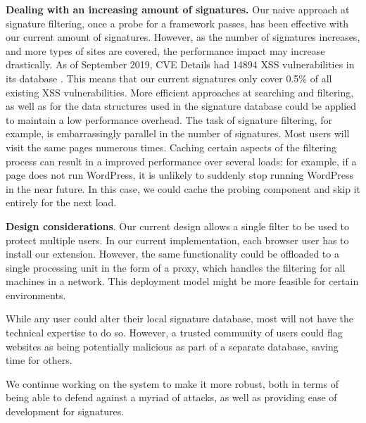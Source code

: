\textbf{Dealing with an increasing amount of signatures.} Our naive approach at signature filtering, once a probe for a framework passes, has been effective with our current amount of signatures. However, as the number of signatures increases, and more types of sites are covered, the performance impact may increase drastically. As of September 2019, CVE Details had 14894 \ac{XSS} vulnerabilities in its database \cite{vulnbytype}. This means that our current signatures only cover 0.5\% of all existing \ac{XSS} vulnerabilities. More efficient approaches at searching and filtering, as well as for the data structures used in the signature database could be applied to maintain a low performance overhead. The task of signature filtering, for example, is embarrassingly parallel in the number of signatures. Most users will visit the same pages numerous times. Caching certain aspects of the filtering process can result in a improved performance over several loads: for example, if a page does not run WordPress, it is unlikely to suddenly stop running WordPress in the near future. In this case, we could cache the probing component and skip it entirely for the next load.

\textbf{Design considerations}. Our current design allows a single filter to be used to protect multiple users. In our current implementation, each browser user has to install our extension. However, the same functionality could be offloaded to a single processing unit in the form of a proxy, which handles the filtering for all machines in a network. This deployment model might be more feasible for certain environments.

While any user could alter their local signature database, most will not have the technical expertise to do so. However, a trusted community of users could flag websites as being potentially malicious as part of a separate database, saving time for others. 

We continue working on the system to make it more robust, both in terms of being able to defend against a myriad of attacks, as well as providing ease of development for signatures. 
